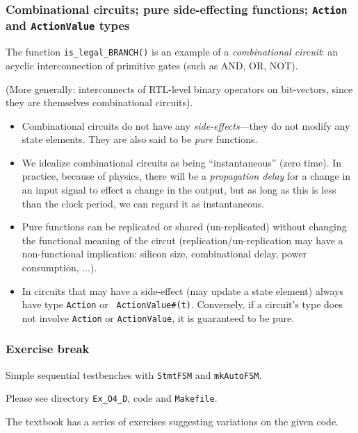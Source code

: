 \begin{frame}[fragile]
\frametitle{Combinational circuits; pure {\vs} side-effecting functions; {\tt Action} and {\tt ActionValue} types}

\footnotesize

The function {\tt is\_legal\_BRANCH()} is an example of a
\emph{combinational circuit}: an acyclic interconnection of primitive
gates (such as AND, OR, NOT).

\vspace{1ex}

(More generally: interconnects of RTL-level binary operators on
bit-vectors, since they are themselves combinational circuits).

\vfill

\begin{itemize}

 \item Combinational circuits do not have any
       \emph{side-effects}---they do not modify any state elements.
       They are also said to be \emph{pure} functions.

 \item We idealize combinational circuits as being ``instantaneous''
       (zero time).  In practice, because of physics, there will be a
       \emph{propagation delay} for a change in an input signal to
       effect a change in the output, but as long as this is less than
       the clock period, we can regard it as instantaneous.

 \item Pure functions can be replicated or shared (un-replicated)
       without changing the functional meaning of the circut
       (replication/un-replication may have a non-functional
       implication: silicon size, combinational delay, power
       consumption, ...).

 \item In {\BSV} circuits that may have a side-effect (may update a
       state element) always have type {\tt Action} or {\tt
       ActionValue\#(t)}.  Conversely, if a circuit's type does not
       involve {\tt Action} or {\tt ActionValue}, it is guaranteed to
       be pure.

\end{itemize}

\end{frame}


\begin{frame}[fragile]
\frametitle{\EmojiExercise \hmm Exercise break}

\footnotesize

Simple sequential testbenches with {\tt StmtFSM} and {\tt mkAutoFSM}.

\vspace{10ex}

Please see directory {\tt Ex\_O4\_D}, code and {\tt Makefile}.

\vspace{2ex}

The textbook has a series of exercises suggesting variations on the given code.

\end{frame}


% 



